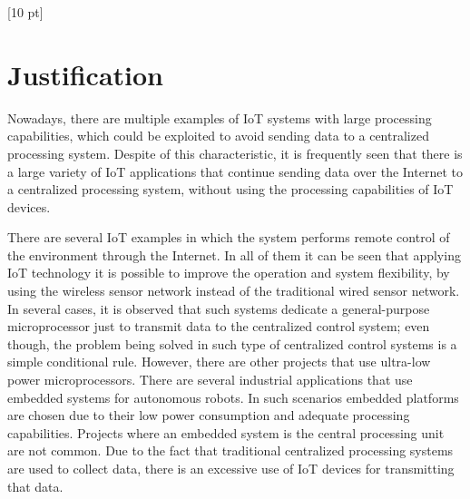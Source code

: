 \titleformat{\chapter}{\Huge\bfseries}{\thechapter}{0 pt}{\rule{340 pt}{3 pt}\\}
\titlespacing{\chapter}{100 pt}{-25 pt}{40 pt}[10 pt]	
\pagestyle{fancy}
\fancyhead[RO,RE]{\thepage}
\fancyfoot[CO,CE]{}

\chapter*{Justification}

\normalsize
\noindent

Nowadays, there are multiple examples of IoT systems with large processing
capabilities, which could be exploited to avoid sending data to a centralized
processing system. Despite of this characteristic, it is frequently seen that
there is a large variety of IoT applications that continue sending data over
the Internet to a centralized processing system, without using the processing
capabilities of IoT devices.

There are several IoT examples in which the system performs remote control of
the environment through the Internet. In all of them it can be seen that
applying IoT technology it is possible to improve the operation and system
flexibility, by using the wireless sensor network instead of the traditional
wired sensor network. In several cases, it is observed that such systems
dedicate a general-purpose microprocessor just to transmit data to the
centralized control system; even though, the problem being solved in such type
of centralized control systems is a simple conditional rule. However, there are
other projects that use ultra-low power microprocessors.  There are several
industrial applications that use embedded systems for autonomous robots. In
such scenarios embedded platforms are chosen due to their low power consumption
and adequate processing capabilities.  Projects where an embedded system is the
central processing unit are not common. Due to the fact that traditional
centralized processing systems are used to collect data, there is an excessive
use of IoT devices for transmitting that data.

